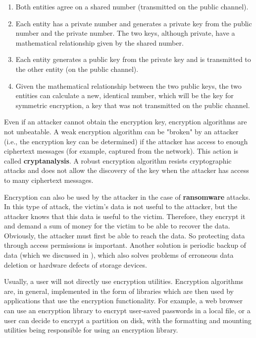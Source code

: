 \begin{enumerate}
  \item Both entities agree on a shared number (transmitted on the public channel).
  \item Each entity has a private number and generates a private key from the public number and the private number.
    The two keys, although private, have a mathematical relationship given by the shared number.
  \item Each entity generates a public key from the private key and is transmitted to the other entity (on the public channel).
  \item Given the mathematical relationship between the two public keys, the two entities can calculate a new, identical number, which will be the key for symmetric encryption, a key that was not transmitted on the public channel.
\end{enumerate}

Even if an attacker cannot obtain the encryption key, encryption algorithms are not unbeatable.
A weak encryption algorithm can be "broken" by an attacker (i.e., the encryption key can be determined) if the attacker has access to enough ciphertext messages (for example, captured from the network).
This action is called \textbf{cryptanalysis}.
A robust encryption algorithm resists cryptographic attacks and does not allow the discovery of the key when the attacker has access to many ciphertext messages.

Encryption can also be used by the attacker in the case of \textbf{ransomware} attacks.
In this type of attack, the victim's data is not useful to the attacker, but the attacker knows that this data is useful to the victim.
Therefore, they encrypt it and demand a sum of money for the victim to be able to recover the data.
Obviously, the attacker must first be able to reach the data.
So protecting data through access permissions is important.
Another solution is periodic backup of data (which we discussed in ), which also solves problems of erroneous data deletion or hardware defects of storage devices.

Usually, a user will not directly use encryption utilities.
Encryption algorithms are, in general, implemented in the form of libraries which are then used by applications that use the encryption functionality.
For example, a web browser can use an encryption library to encrypt user-saved passwords in a local file, or a user can decide to encrypt a partition on disk, with the formatting and mounting utilities being responsible for using an encryption library.

